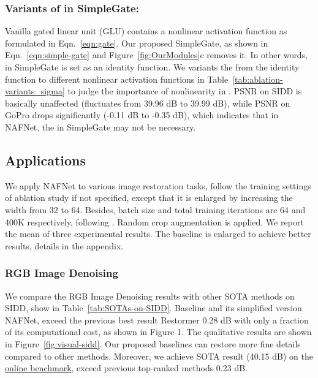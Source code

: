 \documentclass[runningheads]{llncs}
\begin{document}
\subsubsection{Variants of  in SimpleGate:} Vanilla gated linear unit (GLU) contains a nonlinear activation function  as formulated in Eqn.~\ref{eqn:gate}. Our proposed SimpleGate, as shown in Eqn.~\ref{eqn:simple-gate} and Figure~\ref{fig:OurModules}c removes it. In other words,  in SimpleGate is set as an identity function. We variants the  from the identity function to different nonlinear activation functions in Table~\ref{tab:ablation-variants_sigma} to judge the importance of nonlinearity in . PSNR on SIDD is basically unaffected (fluctuates from 39.96 dB to 39.99 dB), while PSNR on GoPro drops significantly (-0.11 dB to -0.35 dB), which indicates that in NAFNet, the  in SimpleGate may not be necessary.
\subsection{Applications}
We apply NAFNet to various image restoration tasks, follow the training settings of ablation study if not specified, except that it is enlarged by increasing the width from 32 to 64. Besides, batch size and total training iterations are 64 and 400K respectively, following \cite{chen2021hinet}. Random crop augmentation is applied.  We report the mean of three experimental results. The baseline is enlarged to achieve better results, details in the appendix.
\subsubsection{RGB Image Denoising} We compare the RGB Image Denoising results with other SOTA methods on SIDD, show in Table~\ref{tab:SOTAs-on-SIDD}. Baseline and its simplified version NAFNet, exceed the previous best result Restormer 0.28 dB with only a fraction of its computational cost, as shown in Figure 1. The qualitative results are shown in Figure~\ref{fig:visual-sidd}. Our proposed baselines can restore more fine details compared to other methods. Moreover, we achieve SOTA result (40.15 dB) on the \href{https://www.eecs.yorku.ca/~kamel/sidd/benchmark.php}{online benchmark}, exceed previous top-ranked methods 0.23 dB.
\end{document}
